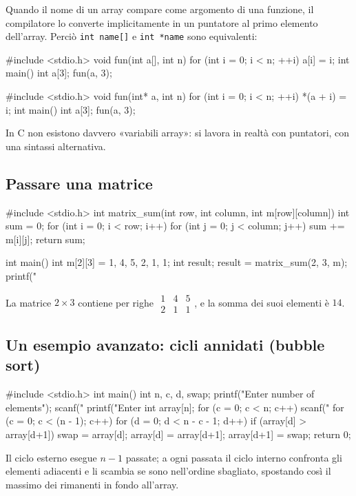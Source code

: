 \documentclass[11pt,a4paper]{article}
\begin{document}
Quando il nome di un array compare come argomento di una funzione, il compilatore lo converte implicitamente in un puntatore al primo elemento dell'array. Perciò \lstinline|int name[]| e \lstinline|int *name| sono equivalenti:
\begin{codice}
#include <stdio.h>
void fun(int a[], int n) {
    for (int i = 0; i < n; ++i)
        a[i] = i;
}
int main() {
    int a[3];
    fun(a, 3);
}
\end{codice}
\begin{codice}
#include <stdio.h>
void fun(int* a, int n) {
    for (int i = 0; i < n; ++i)
        *(a + i) = i;
}
int main() {
    int a[3];
    fun(a, 3);
}
\end{codice}
In C non esistono davvero «variabili array»: si lavora in realtà con puntatori, con una sintassi alternativa.

\subsection{Passare una matrice}

\begin{codice}
#include <stdio.h>
int matrix_sum(int row, int column, int m[row][column]) {
    int sum = 0;
    for (int i = 0; i < row; i++)
        for (int j = 0; j < column; j++)
            sum += m[i][j];
    return sum;
}

int main() {
    int m[2][3] = {1, 4, 5, 2, 1, 1};
    int result;
    result = matrix_sum(2, 3, m);
    printf("%
}
\end{codice}
La matrice $2\times 3$ contiene per righe $\begin{smallmatrix}1&4&5\\2&1&1\end{smallmatrix}$, e la somma dei suoi elementi è $14$.

\subsection{Un esempio avanzato: cicli annidati (bubble sort)}

\begin{codice}
#include <stdio.h>
int main() {
    int n, c, d, swap;
    printf("Enter number of elements\n");
    scanf("%
    printf("Enter %
    int array[n];
    for (c = 0; c < n; c++)
        scanf("%
    for (c = 0; c < (n - 1); c++)
    {
        for (d = 0; d < n - c - 1; d++)
        {
            if (array[d] > array[d+1])
            {
                swap       = array[d];
                array[d]   = array[d+1];
                array[d+1] = swap;
            }
        }
    }
    return 0;
}
\end{codice}
Il ciclo esterno esegue $n - 1$ passate; a ogni passata il ciclo interno confronta gli elementi adiacenti e li scambia se sono nell'ordine sbagliato, spostando così il massimo dei rimanenti in fondo all'array.
\end{document}
